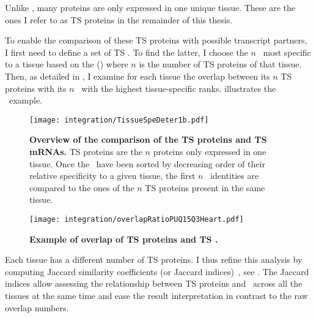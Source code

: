 Unlike \mRNAs,
many proteins are only expressed in one unique tissue.
These are the ones I refer to as \gls{TS} proteins in the remainder of this thesis.\mybr\

To enable the comparison of these \gls{TS} proteins with possible transcript partners,
I first need to define a set of \gls{TS} \mRNAs{}.
To find the latter, I choose the $n$ \mRNAs\ most specific to a tissue
based on the  ()
where $n$ is the number of \gls{TS} proteins of that tissue.
Then, as detailed in ,
I examine for each tissue the overlap between its $n$ \gls{TS} proteins
with its $n$ \mRNAs\ with the highest tissue-specific ranks.
 illustrates the \heart\ example.\mybr\

\begin{figure}[!htb]
    \texttt{[image: integration/TissueSpeDeter1b.pdf]}\centering
    \vspace{-3mm}
    \caption[Determination process of the specific mRNAs]{%
    \label{fig:RankSpe}\textbf{Overview of the comparison of the TS proteins
    and TS mRNAs.}
    \gls{TS} proteins are the $n$ proteins only expressed in one tissue.
    Once the \mRNAs\ have been sorted
    by decreasing order of their relative specificity to a given tissue,
    the first $n$ \mRNAs\ identities are compared
    to the ones of the $n$ \gls{TS} proteins present in the same tissue.
    }
\end{figure}

\begin{figure}[!htbp]
\texttt{[image: integration/overlapRatioPUQ15Q3Heart.pdf]}\centering
\vspace{-3mm}
    \caption[Example of overlap of TS proteins and TS mRNAs for Heart]{%
    \label{fig:ExJacquard}\textbf{Example of overlap of \gls{TS} proteins
    and \gls{TS} \mRNAs.}}
\end{figure}

Each tissue has a different number of \gls{TS} proteins.
I thus refine this analysis
by computing Jaccard similarity coefficients
(or Jaccard indices)~,
see .
The Jaccard indices allow assessing
the relationship between \gls{TS} proteins and \mRNAs\
across all the tissues at the same time
and ease the result interpretation in contrast to the raw overlap numbers.\mybr\

